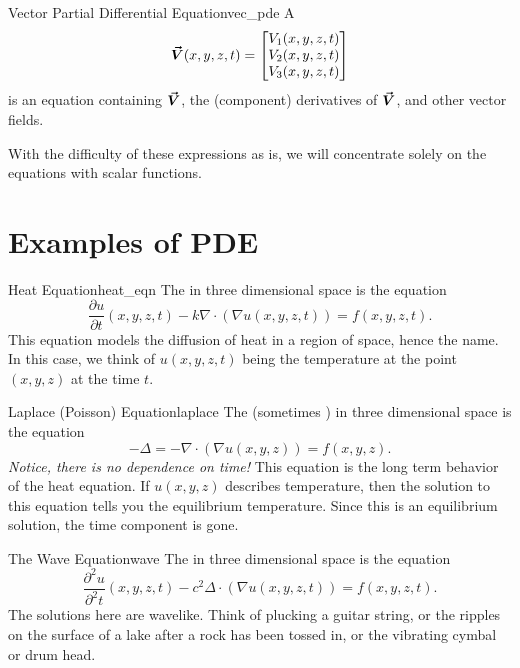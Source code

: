        \begin{df}{Vector Partial Differential Equation}{vec_pde}
        A 
        \[
        \boldsymbol{\vec{V}}(x,y,z,t) = \begin{bmatrix} V_1(x,y,z,t) \\ V_2(x,y,z,t) \\ V_3(x,y,z,t) \end{bmatrix}
        \]
        is an equation containing $\boldsymbol{\vec{V}}$, the (component) derivatives of $\boldsymbol{\vec{V}}$, and other vector fields.
        \end{df}
        
        With the difficulty of these expressions as is, we will concentrate solely on the equations with scalar functions.
    
        \section{Examples of PDE}
        
        \begin{ex}{Heat Equation}{heat_eqn}
        The  in three dimensional space is the equation
        \[
        \frac{\partial u}{\partial t}(x,y,z,t) -k\nabla \cdot (\nabla u(x,y,z,t)) = f(x,y,z,t).
        \]
        This equation models the diffusion of heat in a region of space, hence the name.  In this case, we think of $u(x,y,z,t)$ being the temperature at the point $(x,y,z)$ at the time $t$.
        \end{ex}
        
        \begin{ex}{Laplace (Poisson) Equation}{laplace}
        The  (sometimes )  in three dimensional space is the equation
        \[
        -\Delta=-\nabla \cdot (\nabla u(x,y,z))=f(x,y,z).
        \]
        \emph{Notice, there is no dependence on time!} This equation is the long term behavior of the heat equation.  If $u(x,y,z)$ describes temperature, then the solution to this equation tells you the equilibrium temperature. Since this is an equilibrium solution, the time component is gone.
        \end{ex}
        
        \begin{ex}{The Wave Equation}{wave}
        The  in three dimensional space is the equation
        \[
        \frac{\partial^2 u}{\partial^2 t}(x,y,z,t) -c^2\Delta \cdot (\nabla u(x,y,z,t)) = f(x,y,z,t).
        \]
        The solutions here are wavelike.  Think of plucking a guitar string, or the ripples on the surface of a lake after a rock has been tossed in, or the vibrating cymbal or drum head.
        \end{ex}
        
